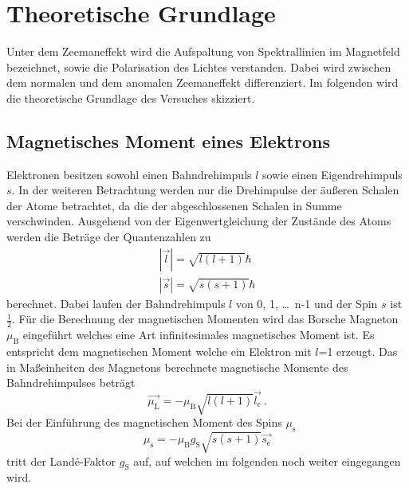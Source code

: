 \section{Theoretische Grundlage}
\label{sec:Theorie}
Unter dem Zeemaneffekt wird die Aufspaltung von Spektrallinien im Magnetfeld bezeichnet, sowie die Polarisation des Lichtes verstanden. Dabei wird zwischen dem normalen und dem anomalen Zeemaneffekt differenziert. Im folgenden wird die theoretische Grundlage des Versuches skizziert.

\subsection{Magnetisches Moment eines Elektrons}
Elektronen besitzen sowohl einen Bahndrehimpuls $l$ sowie einen Eigendrehimpuls $s$. In der weiteren Betrachtung werden nur die Drehimpulse der äußeren Schalen der Atome betrachtet, da die der abgeschlossenen Schalen in Summe verschwinden. Ausgehend von der Eigenwertgleichung der Zustände des Atoms werden die Beträge der Quantenzahlen zu
\begin{eqnarray}
  |\vec{l}| = \sqrt{l(l+1)} \hbar  \\
  |\vec{s}| = \sqrt{s(s+1)} \hbar
  \label{eqn:betQua}
\end{eqnarray}
berechnet. Dabei laufen der Bahndrehimpuls $l$ von 0, 1, \ldots $\,$ n-1 und der Spin $s$ ist $\frac{1}{2}$. Für die Berechnung der magnetischen Momenten wird das Borsche Magneton $\mu_\text{B}$ eingeführt welches eine Art infinitesimales magnetisches Moment ist. Es entspricht dem magnetischen Moment welche ein Elektron mit $l$=1 erzeugt. Das in Maßeinheiten des Magnetons berechnete magnetische Momente des Bahndrehimpulses beträgt
\begin{equation}
  \vec{\mu_\text{L}} = -\mu_\text{B} \sqrt{l(l+1)} \vec{l_\text{e}} \ .
  \label{eqn:magL}
\end{equation}
Bei der Einführung des magnetischen Moment des Spins $\mu_\text{s}$
\begin{equation}
  \mu_\text{s} = - \mu_\text{B} g_\text{S} \sqrt{s(s+1)} \vec{s_\text{e}}
  \label{eqn:magS}
\end{equation}
tritt der Landé-Faktor $g_\text{S}$ auf, auf welchen im folgenden noch weiter eingegangen wird.

